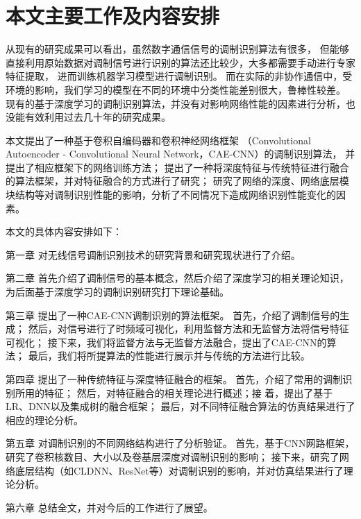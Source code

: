 \section{本文主要工作及内容安排}
从现有的研究成果可以看出，虽然数字通信信号的调制识别算法有很多，
但能够直接利用原始数据对调制信号进行识别的算法还比较少，大多都需要手动进行专家特征提取，
进而训练机器学习模型进行调制识别。
而在实际的非协作通信中，受环境的影响，我们学习的模型在不同的环境中分类性能差别很大，鲁棒性较差。
现有的基于深度学习的调制识别算法，并没有对影响网络性能的因素进行分析，也没能有效利用过去几十年的研究成果。\par

本文提出了一种基于卷积自编码器和卷积神经网络框架
（Convolutional Autoencoder - Convolutional Neural Network，CAE-CNN）的调制识别算法，
并提出了相应框架下的网络训练方法；
提出了一种将深度特征与传统特征进行融合的算法框架，并对特征融合的方式进行了研究；
研究了网络的深度、网络底层模块结构等对调制识别性能的影响，分析了不同情况下造成网络识别性能变化的因素。 \par

本文的具体内容安排如下：

第一章 对无线信号调制识别技术的研究背景和研究现状进行了介绍。\par

第二章 首先介绍了调制信号的基本概念，然后介绍了深度学习的相关理论知识，
为后面基于深度学习的调制识别研究打下理论基础。 \par

第三章 提出了一种CAE-CNN调制识别的算法框架。
首先，介绍了调制信号的生成；
然后，对信号进行了时频域可视化，利用监督方法和无监督方法将信号特征可视化；
接下来，我们将监督方法与无监督方法融合，提出了CAE-CNN的算法；
最后，我们将所提算法的性能进行展示并与传统的方法进行比较。 \par

第四章 提出了一种传统特征与深度特征融合的框架。
首先，介绍了常用的调制识别所用的特征；
然后，对特征融合的相关理论进行概述；接
着，提出了基于LR、DNN以及集成树的融合框架；
最后，对不同特征融合算法的仿真结果进行了相应的理论分析。 \par

第五章 对调制识别的不同网络结构进行了分析验证。
首先，基于CNN网路框架，研究了卷积核数目、大小以及卷基层深度对调制识别的影响；
接下来，研究了网络底层结构（如CLDNN、ResNet等）对调制识别的影响，并对仿真结果进行了理论分析。\par

第六章 总结全文，并对今后的工作进行了展望。\par
